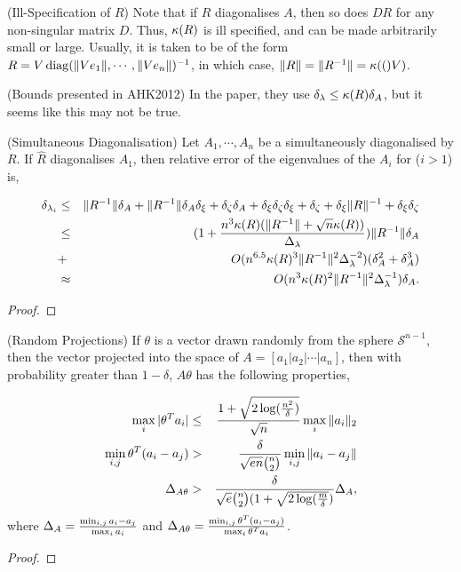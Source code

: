 \begin{remark} (Ill-Specification of $R$)
  Note that if $R$ diagonalises $A$, then so does $DR$ for any non-singular matrix $D$. Thus, $\kappa(R)$ is ill specified, and can be made arbitrarily small or large. Usually, it is taken to be of the form $R = V\operatorname{diag}(\|V e_1\|, \cdots, \|V e_n\|)^{-1}$, in which case, $\|R\| = \|R^{-1}\| = \kappa(()V)$.
\end{remark}

\begin{remark} (Bounds presented in AHK2012)
    In the paper, they use $\delta_{\lambda} \le \kappa(R)\delta_A$, but
    it seems like this may not be true.
\end{remark}

\begin{proposition}(Simultaneous Diagonalisation)
  Let $A_1, \cdots, A_n$ be a simultaneously diagonalised by $R$. If $\hat{R}$ diagonalises $A_1$, then relative
    error of the eigenvalues of the $A_i$ for ($i > 1$) is,

    \begin{eqnarray}
    \delta_{\lambda_i} 
      &\le& \|R^{-1}\| \delta_{A} + \|R^{-1}\| \delta_{A} \delta_{\xi}
            + \delta_{\zeta} \delta_{A} + \delta_{\xi} \delta_{\zeta} \delta_{\xi}
            + \delta_{\zeta} + \delta_{\xi} \|R\|^{-1} + \delta_{\xi} \delta_{\zeta} \\
      &\le& (1 + \frac{ n^3 \kappa(R) (\|R^{-1}\| + \sqrt{n} \kappa(R))}{\Delta_{\lambda}} ) \|R^{-1}\| \delta_{A} \\ 
      &+& O(n^{6.5} \kappa(R)^3 \|R^{-1}\|^2 \Delta_{\lambda}^{-2}) (\delta_{A}^2 + \delta_{A}^3) \\
    &\approx& O(n^3 \kappa(R)^2 \|R^{-1}\|^2 \Delta_{\lambda}^{-1}) \delta_{A}.
    \end{eqnarray}
\end{proposition}

\begin{proof}
\end{proof}

\begin{proposition}(Random Projections)
  If $\theta$ is a vector drawn randomly from the sphere
  $\mathcal{S}^{n-1}$, then the vector projected into the space of $A
  = [a_1 | a_2 | \cdots | a_n]$, then with probability greater than
  $1-\delta$, $A\theta$ has the following properties,

  \begin{eqnarray}
    \max_i |\theta^T a_i| &\le& \frac{1 + \sqrt{2 \log(\frac{n^2}{\delta})}}{\sqrt{n}} \max_i \|a_i\|_2 \\
    \min_{i,j} \theta^T (a_i -a_j)  &>& \frac{\delta}{\sqrt{en} \binom{n}{2}} \min_{i,j} \|a_i - a_j\| \\
    \Delta_{A\theta} &>& \frac{\delta}{\sqrt{e} \binom{n}{2} (1+\sqrt{2\log(\frac{m}{\delta}})} \Delta_{A},
  \end{eqnarray}
  where $\Delta_{A} = \frac{\min_{i,j} a_i - a_j}{\max_i a_i}$ and
    $\Delta_{A\theta} = \frac{\min_{i,j} \theta^T(a_i - a_j)}{\max_i
    \theta^Ta_i}$.
\end{proposition}

\begin{proof}
\end{proof}

